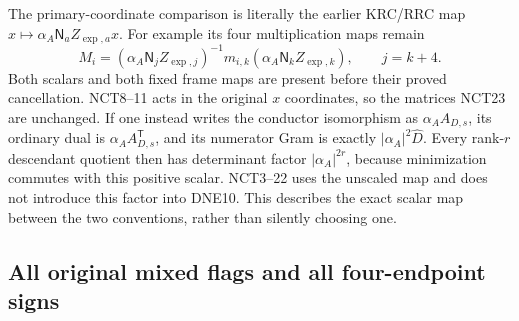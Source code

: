 \documentclass[11pt,a4paper]{article}
\begin{document}
The primary-coordinate comparison is literally the earlier
KRC/RRC map \(x\mapsto\alpha_A\mathsf N_a Z_{\exp,a}x\).
For example its four multiplication maps remain
\[
 M_i=(\alpha_A\mathsf N_jZ_{\exp,j})^{-1}
           m_{i,k}(\alpha_A\mathsf N_kZ_{\exp,k}),\qquad j=k+4.
 \tag{NCT23}
\]
Both scalars and both fixed frame maps are present before their
proved cancellation.  NCT8--11 acts in the original \(x\)
coordinates, so the matrices NCT23 are unchanged.  If one instead
writes the conductor isomorphism as \(\alpha_A A_{D,s}\), its
ordinary dual is \(\alpha_A A_{D,s}^{\mathsf T}\), and its
numerator Gram is exactly \(|\alpha_A|^2\widehat D\).
Every rank-\(r\) descendant quotient then has determinant factor
\(|\alpha_A|^{2r}\), because minimization commutes with this
positive scalar.  NCT3--22 uses the unscaled map and does not
introduce this factor into DNE10.  This describes the exact scalar
map between the two conventions, rather than silently choosing one.

\subsection{All original mixed flags and all four-endpoint signs}
\end{document}
